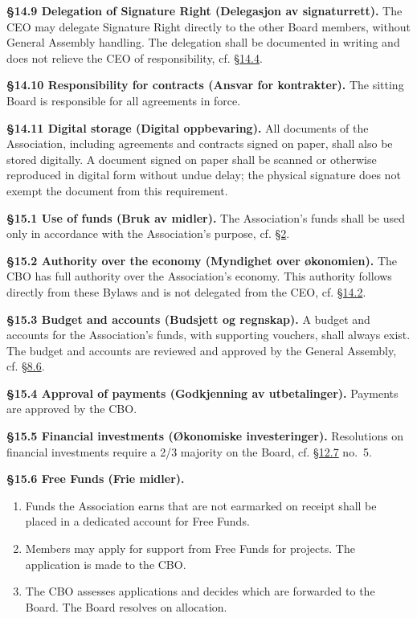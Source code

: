 \documentclass{../../../Common/Latex/Templates/rapport}
\begin{document}
\textbf{\S 14.9 Delegation of Signature Right (Delegasjon av signaturrett).}\label{bylaw:14.9} The CEO may delegate Signature Right directly to the other Board members, without General Assembly handling. The delegation shall be documented in writing and does not relieve the CEO of responsibility, cf. \hyperref[bylaw:14.4]{\S 14.4}.

\textbf{\S 14.10 Responsibility for contracts (Ansvar for kontrakter).}\label{bylaw:14.10} The sitting Board is responsible for all agreements in force.

\textbf{\S 14.11 Digital storage (Digital oppbevaring).}\label{bylaw:14.11} All documents of the Association, including agreements and contracts signed on paper, shall also be stored digitally. A document signed on paper shall be scanned or otherwise reproduced in digital form without undue delay; the physical signature does not exempt the document from this requirement.


\label{bylaw:15}
\textbf{\S 15.1 Use of funds (Bruk av midler).}\label{bylaw:15.1} The Association's funds shall be used only in accordance with the Association's purpose, cf. \hyperref[bylaw:2]{\S 2}.

\textbf{\S 15.2 Authority over the economy (Myndighet over økonomien).}\label{bylaw:15.2} The CBO has full authority over the Association's economy. This authority follows directly from these Bylaws and is not delegated from the CEO, cf. \hyperref[bylaw:14.2]{\S 14.2}.

\textbf{\S 15.3 Budget and accounts (Budsjett og regnskap).}\label{bylaw:15.3} A budget and accounts for the Association's funds, with supporting vouchers, shall always exist. The budget and accounts are reviewed and approved by the General Assembly, cf. \hyperref[bylaw:8.6]{\S 8.6}.

\textbf{\S 15.4 Approval of payments (Godkjenning av utbetalinger).}\label{bylaw:15.4} Payments are approved by the CBO.

\textbf{\S 15.5 Financial investments (Økonomiske investeringer).}\label{bylaw:15.5} Resolutions on financial investments require a 2/3 majority on the Board, cf. \hyperref[bylaw:12.7]{\S 12.7} no.\ 5.

\textbf{\S 15.6 Free Funds (Frie midler).}\label{bylaw:15.6}
\begin{enumerate}
  \item Funds the Association earns that are not earmarked on receipt shall be placed in a dedicated account for Free Funds.
  \item Members may apply for support from Free Funds for projects. The application is made to the CBO.
  \item The CBO assesses applications and decides which are forwarded to the Board. The Board resolves on allocation.
\end{enumerate}
\end{document}
